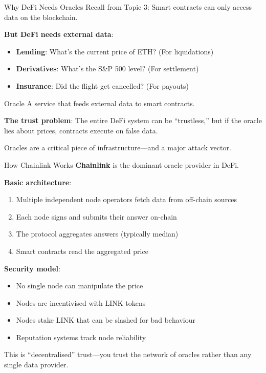 \documentclass[10pt]{beamer}
\begin{document}
\begin{frame}{Why DeFi Needs Oracles}
  Recall from Topic 3: Smart contracts can only access data on the blockchain.
  
  \vspace{1em}
  \textbf{But DeFi needs external data}:
  \begin{itemize}
    \item \textbf{Lending}: What's the current price of ETH? (For liquidations)
    \item \textbf{Derivatives}: What's the S\&P 500 level? (For settlement)
    \item \textbf{Insurance}: Did the flight get cancelled? (For payouts)
  \end{itemize}
  
  \vspace{1em}
  \begin{block}{Oracle}
    A service that feeds external data to smart contracts.
  \end{block}
  
  \vspace{0.5em}
  \textbf{The trust problem}: The entire DeFi system can be ``trustless,'' but if the oracle lies about prices, contracts execute on false data.
  
  \vspace{0.5em}
  Oracles are a critical piece of infrastructure---and a major attack vector.
\end{frame}

\begin{frame}{How Chainlink Works}
  \textbf{Chainlink} is the dominant oracle provider in DeFi.
  
  \vspace{1em}
  \textbf{Basic architecture}:
  \begin{enumerate}
    \item Multiple independent node operators fetch data from off-chain sources
    \item Each node signs and submits their answer on-chain
    \item The protocol aggregates answers (typically median)
    \item Smart contracts read the aggregated price
  \end{enumerate}
  
  \vspace{1em}
  \textbf{Security model}:
  \begin{itemize}
    \item No single node can manipulate the price
    \item Nodes are incentivised with LINK tokens
    \item Nodes stake LINK that can be slashed for bad behaviour
    \item Reputation systems track node reliability
  \end{itemize}
  
  \vspace{0.5em}
  This is ``decentralised'' trust---you trust the network of oracles rather than any single data provider.
\end{frame}
\end{document}
